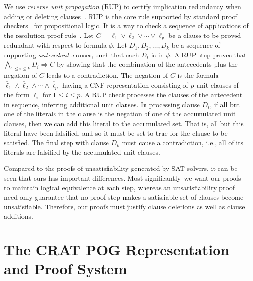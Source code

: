 \documentclass[letterpaper,USenglish,cleveref, autoref, thm-restate]{lipics-v2021}
\newcommand{\obar}[1]{\overline{#1}}
\newcommand{\lit}{\ell}
\newcommand{\imply}{\Rightarrow}
\begin{document}
We use {\em reverse unit propagation} (RUP) to certify
implication redundancy when adding or deleting
clauses~\cite{goldberg,vangelder08_verifying_rup_proofs}.
RUP
is the core rule supported by standard
proof checkers~\cite{RAT,wetzler14_drattrim} for propositional logic.
It is a way to check a sequence of applications of the resolution proof rule~\cite{robinson-1965}.
Let $C = \lit_1 \lor \lit_2 \lor \cdots \lor \lit_p$ be a clause to be
proved redundant with respect to formula $\phi$.  Let $D_1, D_2, \ldots, D_k$ be a sequence of supporting
{\em antecedent} clauses, such that each $D_i$ is in $\phi$.
A RUP step
proves that $\bigwedge_{1\leq i \leq k} D_i \imply C$ by showing
that the combination of the antecedents plus the negation of $C$ leads
to a contradiction.  The negation of $C$ is the formula
$\overline{\lit}_1 \land \overline{\lit}_2 \land \cdots \land
\overline{\lit}_p$ having a CNF representation consisting of $p$ unit
clauses of the form $\obar{\lit}_i$ for $1 \leq i \leq p$.  A RUP
check processes the clauses of the antecedent in sequence, inferring
additional unit clauses.  In processing clause $D_i$, if all but one
of the literals in the clause is the negation of one of the
accumulated unit clauses, then we can add this literal to the
accumulated set.  That is, all but this literal have been falsified,
and so it must be set to true for the clause to be satisfied.  The
final step with clause $D_k$ must cause a contradiction, i.e., all of
its literals are falsified by the accumulated unit clauses.

Compared to the proofs of unsatisfiability generated by SAT solvers,
it can be seen that ours has important differences.  Most
significantly, we want our proofs to maintain logical equivalence at
each step, whereas an unsatisfiability proof need only guarantee that
no proof step makes a satisfiable set of clauses become
unsatisfiable.  Therefore, our proofs must justify clause deletions as well as clause additions.


\section{The CRAT POG Representation and Proof System}
\label{sect:crat}
\end{document}
